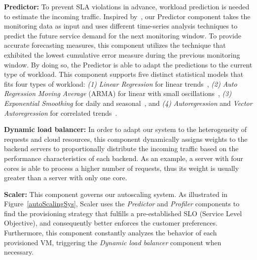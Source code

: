 
\textbf{Predictor: } To prevent SLA violations in advance, workload prediction is needed to estimate the incoming traffic. Inspired by~\cite{wolski_network_1999}, our Predictor component takes the monitoring data as input and uses different time-series analysis techniques to predict the future service demand for the next monitoring window. To provide accurate forecasting measures, this component utilizes the technique that exhibited the lowest cumulative error measure during the previous monitoring window. By doing so, the Predictor is able to adapt the predictions to the current type of workload. This component supports five distinct statistical models that fits four types of workload: \emph{(1)} \emph{Linear Regression} for linear trends~\cite{muppala_regression-based_2012}, \emph{(2)} \emph{Auto Regression Moving Average} (ARMA) for linear with small oscillations~\cite{roy_efficient_2011}, \emph{(3)} \emph{Exponential Smoothing} for daily and seasonal~\cite{exponential_smoothing2010}, and \emph{(4)} \emph{Autoregression} and \emph{Vector Autoregression} for correlated trends~\cite{vector_autoregression_2006,chandra_dynamic_2003}. 


\vspace{2mm}

\textbf{Dynamic load balancer: } In order to adapt our system to the heterogeneity of requests and cloud resources, this component dynamically assigns weights to the backend servers to proportionally distribute the incoming traffic based on the performance characteristics of each backend. As an example, a server with four cores is able to process a higher number of requests, thus its weight is usually greater than a server with only one core.

\vspace{2mm}

\textbf{Scaler:} This component governs our autoscaling system. As illustrated in Figure~\ref{autoScalingSys}, Scaler uses the \emph{Predictor} and \emph{Profiler} components to find the provisioning strategy that fulfills a pre-established SLO (Service Level Objective), and consequently better enforces the customer preferences. Furthermore, this component constantly analyzes the behavior of each provisioned VM, triggering the \emph{Dynamic load balancer} component when necessary.

